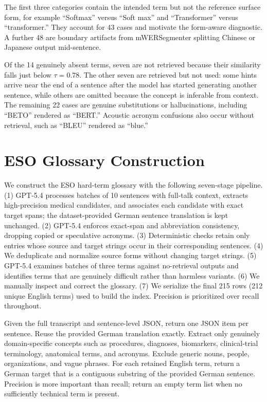 The first three categories contain the intended term but not the reference surface form, for example ``Softmax'' versus ``Soft max'' and ``Transformer'' versus ``transformer.'' They account for 43 cases and motivate the form-aware diagnostic. A further 48 are boundary artifacts from mWERSegmenter splitting Chinese or Japanese output mid-sentence.

Of the 14 genuinely absent terms, seven are not retrieved because their similarity falls just below $\tau{=}0.78$. The other seven are retrieved but not used: some hints arrive near the end of a sentence after the model has started generating another sentence, while others are omitted because the concept is inferable from context. The remaining 22 cases are genuine substitutions or hallucinations, including ``BETO'' rendered as ``BERT.'' Acoustic acronym confusions also occur without retrieval, such as ``BLEU'' rendered as ``blue.''

\FloatBarrier
\section{\texorpdfstring{ESO Glossary Construction}{ESO Glossary Construction}}
\label{app:eso_glossary}

We construct the ESO hard-term glossary with the following seven-stage pipeline. (1) GPT-5.4 processes batches of 10 sentences with full-talk context, extracts high-precision medical candidates, and associates each candidate with exact target spans; the dataset-provided German sentence translation is kept unchanged. (2) GPT-5.4 enforces exact-span and abbreviation consistency, dropping copied or speculative acronyms. (3) Deterministic checks retain only entries whose source and target strings occur in their corresponding sentences. (4) We deduplicate and normalize source forms without changing target strings. (5) GPT-5.4 examines batches of three terms against no-retrieval outputs and identifies terms that are genuinely difficult rather than harmless variants. (6) We manually inspect and correct the glossary. (7) We serialize the final 215 rows (212 unique English terms) used to build the index. Precision is prioritized over recall throughout.

\begin{tcolorbox}[
  colback=black!2,
  colframe=black!55!black,
  coltext=black,
  title={Stage 1 prompt: candidate extraction},
  fonttitle=\bfseries,
  boxrule=0.4pt]
\ttfamily\footnotesize
Given the full transcript and sentence-level JSON, return one JSON item per sentence. Reuse the provided German translation exactly. Extract only genuinely domain-specific concepts such as procedures, diagnoses, biomarkers, clinical-trial terminology, anatomical terms, and acronyms. Exclude generic nouns, people, organizations, and vague phrases. For each retained English term, return a German target that is a contiguous substring of the provided German sentence. Precision is more important than recall; return an empty term list when no sufficiently technical term is present.
\end{tcolorbox}

